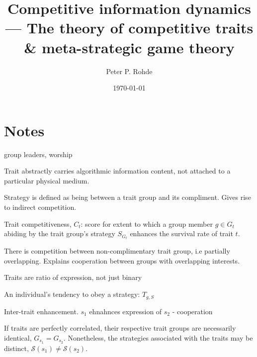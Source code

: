 \documentclass[twocolumn, aps, rmp, amsmath, amssymb, nofootinbib, superscriptaddress, longbibliography, floatfix, table-of-contents, eqsecnum]{revtex4-1}
\begin{document}
%
%

\title{Competitive information dynamics --- The theory of competitive traits \& meta-strategic game theory}

%
%

\author{Peter P. Rohde}

\date{\today}

\frenchspacing

%
%

\begin{abstract}
\end{abstract}

\maketitle

\tableofcontents

\section{Notes}

group leaders, worship

Trait abstractly carries algorithmic information content, not attached to a particular physical medium.

Strategy is defined as being between a trait group and its compliment. Gives rise to indirect competition.

Trait competitiveness, $C_t$: score for extent to which a group member $g\in G_t$ abiding by the trait group's strategy $S_{G_t}$ enhances the survival rate of trait $t$.

There is competition between non-complimentary trait group, i.e partially overlapping. Explains cooperation between groups with overlapping interests.

Traits are ratio of expression, not just binary

An individual's tendency to obey a strategy: $T_{g,S}$

Inter-trait enhancement. $s_1$ ehnahnces expression of $s_2$ - cooperation

If traits are perfectly correlated, their respective trait groups are necessarily identical, $G_{s_1}=G_{s_2}$. Nonetheless, the strategies associated with the traits may be distinct, $\mathcal{S}(s_1)\neq\mathcal{S}(s_2)$.
\end{document}
